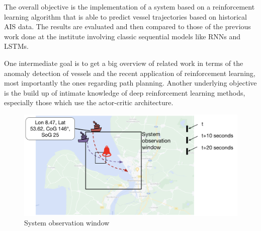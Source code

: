 The overall objective is the implementation of a system based on a reinforcement learning algorithm that is able to predict vessel trajectories based on historical AIS data. The results are evaluated and then compared to those of the previous work done at the institute involving classic sequential models like RNNs and LSTMs.
\par
One intermediate goal is to get a big overview of related work in terms of the anomaly detection of vessels and the recent application of reinforcement learning, most importantly the ones regarding path planning. Another underlying objective is the build up of intimate knowledge of deep reinforcement learning methods, especially those which use the actor-critic architecture.
\par

\begin{figure}[H]
    \centering
    \includegraphics[width=\textwidth]{images/system_observation.png}
    \caption{System observation window}
    \label{fig:systemObservation}
\end{figure}